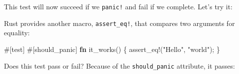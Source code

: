 \documentclass[a4paper,]{book}
\newenvironment{Shaded}{\begin{snugshade}}{\end{snugshade}}
\newcommand{\KeywordTok}[1]{\textcolor[rgb]{0.13,0.29,0.53}{\textbf{{#1}}}}
\newcommand{\StringTok}[1]{\textcolor[rgb]{0.31,0.60,0.02}{{#1}}}
\newcommand{\OtherTok}[1]{\textcolor[rgb]{0.56,0.35,0.01}{{#1}}}
\newcommand{\NormalTok}[1]{{#1}}
\begin{document}
This test will now succeed if we \texttt{panic!} and fail if we
complete. Let's try it:

\begin{Shaded}
\end{Shaded}

Rust provides another macro, \texttt{assert\_eq!}, that compares two
arguments for equality:

\begin{Shaded}
\begin{Highlighting}[]
\OtherTok{#[}\NormalTok{test}\OtherTok{]}
\OtherTok{#[}\NormalTok{should_panic}\OtherTok{]}
\KeywordTok{fn} \NormalTok{it_works() \{}
    \OtherTok{assert_eq!}\NormalTok{(}\StringTok{"Hello"}\NormalTok{, }\StringTok{"world"}\NormalTok{);}
\NormalTok{\}}
\end{Highlighting}
\end{Shaded}

Does this test pass or fail? Because of the \texttt{should\_panic}
attribute, it passes:
\end{document}
